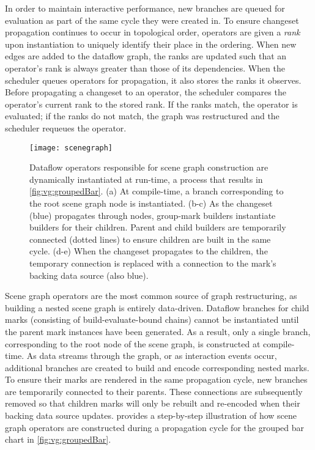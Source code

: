In order to maintain interactive performance, new branches are queued for
evaluation as part of the same cycle they were created in. To ensure changeset
propagation continues to occur in topological order, operators are given a
\emph{rank} upon instantiation to uniquely identify their place in the ordering.
When new edges are added to the dataflow graph, the ranks are updated such that
an operator's rank is always greater than those of its dependencies. When the
scheduler queues operators for propagation, it also stores the ranks it
observes. Before propagating a changeset to an operator, the scheduler compares
the operator's current rank to the stored rank. If the ranks match, the operator
is evaluated; if the ranks do not match, the graph was restructured and the
scheduler requeues the operator.

\begin{figure}[t!]
  \centering
  \texttt{[image: scenegraph]}
  \caption{Dataflow operators responsible for scene graph construction are
dynamically instantiated at run-time, a process that results in
\cref{fig:vg:groupedBar}. (a) At compile-time, a branch corresponding  to the
root scene graph node is instantiated. (b-c) As the changeset (blue) propagates
through nodes, group-mark builders instantiate builders for their children.
Parent and child builders are temporarily connected (dotted lines) to ensure
children are built in the same cycle. (d-e) When the changeset propagates to the
children, the temporary connection is replaced with a connection to the mark's
backing data source (also blue).}
  \label{fig:vg:scenegraph}
\end{figure}

Scene graph operators are the most common source of graph restructuring, as
building a nested scene graph is entirely data-driven. Dataflow branches for
child marks (consisting of build-evaluate-bound chains) cannot be instantiated
until the parent mark instances have been generated. As a result, only a single
branch, corresponding to the root node of the scene graph, is constructed at
compile-time. As data streams through the graph, or as interaction events occur,
additional branches are created to build and encode corresponding nested marks.
To ensure their marks are rendered in the same propagation cycle, new branches
are temporarily connected to their parents. These connections are subsequently
removed so that children marks will only be rebuilt and re-encoded when their
backing data source updates.  provides a step-by-step
illustration of how scene graph operators are constructed during a propagation
cycle for the grouped bar chart in \cref{fig:vg:groupedBar}.